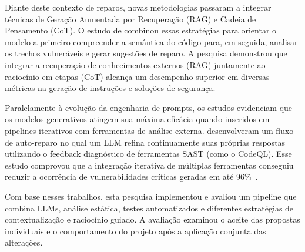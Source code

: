 Diante deste contexto de reparos, novas metodologias passaram a integrar técnicas de Geração Aumentada por Recuperação (RAG) e Cadeia de Pensamento (CoT). O estudo de  combinou essas estratégias para orientar o modelo a primeiro compreender a semântica do código para, em seguida, analisar os trechos vulneráveis e gerar sugestões de reparo. A pesquisa demonstrou que integrar a recuperação de conhecimentos externos (RAG) juntamente ao raciocínio em etapas (CoT) alcança um desempenho superior em diversas métricas na geração de instruções e soluções de segurança.

Paralelamente à evolução da engenharia de prompts, os estudos evidenciam que os modelos generativos atingem sua máxima eficácia quando inseridos em pipelines iterativos com ferramentas de análise externa.  desenvolveram um fluxo de auto-reparo no qual um LLM refina continuamente suas próprias respostas utilizando o feedback diagnóstico de ferramentas SAST (como o CodeQL). Esse estudo comprovou que a integração iterativa de múltiplas ferramentas conseguiu reduzir a ocorrência de vulnerabilidades críticas geradas em até 96\%\ .

Com base nesses trabalhos, esta pesquisa implementou e avaliou um pipeline que combina LLMs, análise estática, testes automatizados e diferentes estratégias de contextualização e raciocínio guiado. A avaliação examinou o aceite das propostas individuais e o comportamento do projeto após a aplicação conjunta das alterações.